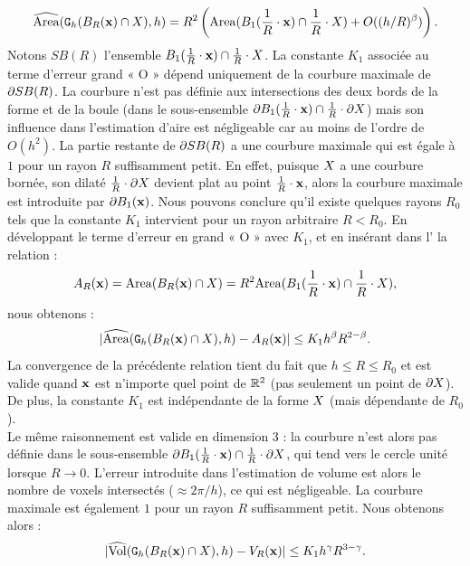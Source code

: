 \begin{equation}
  \label{eq:Area_unitary_ball_shape}
  \AreaC(\DigF{\Ball{R}{\vx} \cap \Shape}{h}, h) = R^2 \left(\Area( \Ball{1}{\frac{1}{R} \cdot \vx} \cap \frac{1}{R} \cdot \Shape) + O( (h/R)^\beta) \right).
\end{equation}
%
Notons $SB(R)$ l'ensemble $\Ball{1}{\frac{1}{R} \cdot \vx} \cap \frac{1}{R} \cdot
\Shape$. La constante $K_1$ associée au terme d'erreur grand « O » dépend
uniquement de la courbure maximale de $\BT SB(R)$. La courbure n'est pas définie
aux intersections des deux bords de la forme et de la boule (dans le
sous-ensemble $\BT \Ball{1}{\frac{1}{R} \cdot \vx} \cap \frac{1}{R} \cdot \dS$) mais
son influence dans l'estimation d'aire est négligeable car au moins de l'ordre
de $O(h^2)$. La partie restante de $\BT SB(R)$ a une courbure maximale qui est
égale à $1$ pour un rayon $R$ suffisamment petit. En effet, puisque $\Shape$ a
une courbure bornée, son dilaté $\frac{1}{R} \cdot \dS$ devient plat au point
$\frac{1}{R} \cdot \vx$, alors la courbure maximale est introduite par $\BT
\Ball{1}{\vx}$. Nous pouvons conclure qu'il existe quelques rayons $R_0$ tels que la
constante $K_1$ intervient pour un rayon arbitraire $R < R_0$. En développant le
terme d'erreur en grand « O » avec $K_1$, et en insérant dans
l' la relation :
%
\begin{equation}
  A_R(\vx) = \Area( \Ball{R}{\vx} \cap \Shape ) = R^2 \Area( \Ball{1}{\frac{1}{R} \cdot \vx} \cap \frac{1}{R} \cdot \Shape),
\end{equation}
%
nous obtenons :
%
\begin{equation}\label{eq:convergence-area-intersection}
  | \AreaC(\DigF{\Ball{R}{\vx} \cap \Shape}{h}, h) - A_R(\vx) | \le K_1 h^\beta R^{2-\beta}.
\end{equation}
%
La convergence de la précédente relation tient du fait que $h \le R \le R_0$ et
est valide quand $\vx$ est n'importe quel point de $\R^2$ (pas seulement un
point de $\dS$). De plus, la constante $K_1$ est indépendante de la forme
$\Shape$ (mais dépendante de $R_0$).\\
%
Le même raisonnement est valide en dimension 3 : la courbure n'est alors pas
définie dans le sous-ensemble $\BT \Ball{1}{\frac{1}{R} \cdot \vx} \cap \frac{1}{R}
\cdot \dS$, qui tend vers le cercle unité lorsque $R \rightarrow 0$. L'erreur
introduite dans l'estimation de volume est alors le nombre de voxels intersectés
($\approx 2\pi/h$), ce qui est négligeable. La courbure maximale est également
$1$ pour un rayon $R$ suffisamment petit. Nous obtenons alors :
%
\begin{equation}\label{eq:convergence-volume-intersection}
  | \VolC(\DigF{\Ball{R}{\vx} \cap \Shape}{h}, h) - V_R(\vx) | \le K_1 h^\gamma R^{3-\gamma}.
\end{equation}
%
